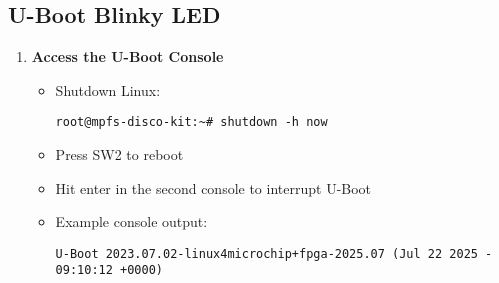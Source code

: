 \clearpage
\subsection{U-Boot Blinky LED}

\begin{enumerate}
\item \textbf{Access the U-Boot Console}
%
\begin{itemize}
\item Shutdown Linux:
\begin{verbatim}
root@mpfs-disco-kit:~# shutdown -h now
\end{verbatim}
\item Press SW2 to reboot
\item Hit enter in the second console to interrupt U-Boot
\item Example console output:
\begin{verbatim}
U-Boot 2023.07.02-linux4microchip+fpga-2025.07 (Jul 22 2025 - 09:10:12 +0000)


\end{verbatim}
\end{itemize}
\end{enumerate}
